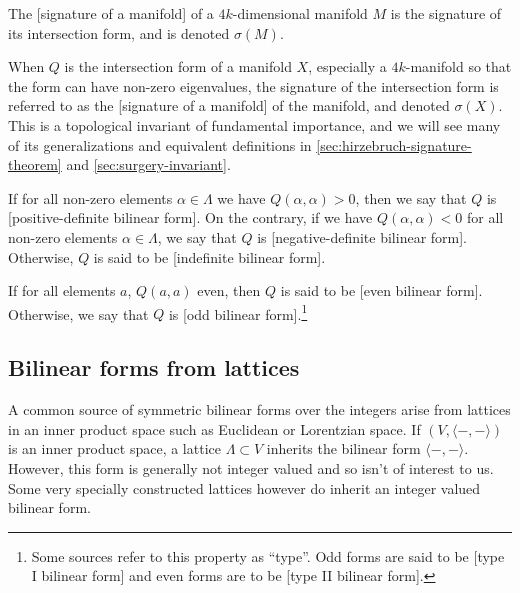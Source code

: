 \begin{definition}
	The [signature of a manifold] of a $4k$-dimensional manifold $M$ is the signature of its intersection form, and is denoted $\sigma(M)$.
\end{definition}

When $Q$ is the intersection form of a manifold $X$, especially a $4k$-manifold so that the form can have non-zero eigenvalues, the signature of the intersection form is referred to as the [signature of a manifold] of the manifold, and denoted $\sigma(X)$. This is a topological invariant of fundamental importance, and we will see many of its generalizations and equivalent definitions in \cref{sec:hirzebruch-signature-theorem} and \cref{sec:surgery-invariant}.

\begin{definition}
	If for all non-zero elements $\alpha\in \Lambda$ we have $Q(\alpha,\alpha)>0$, then we say that $Q$ is [positive-definite bilinear form]. On the contrary, if we have $Q(\alpha,\alpha)<0$ for all non-zero elements $\alpha\in \Lambda$, we say that $Q$ is [negative-definite bilinear form]. Otherwise, $Q$ is said to be [indefinite bilinear form].
\end{definition}

\begin{definition}
	If for all elements $a$, $Q(a,a)$ even, then $Q$ is said to be [even bilinear form]. Otherwise, we say that $Q$ is [odd bilinear form].\footnote{Some sources refer to this property as ``type''. Odd forms are said to be [type I bilinear form] and even forms are to be [type II bilinear form].}
\end{definition}

\subsection{Bilinear forms from lattices}

A common source of symmetric bilinear forms over the integers arise from lattices in an inner product space such as Euclidean or Lorentzian space. If $(V,\langle -,-\rangle)$ is an inner product space, a lattice $\Lambda\subset V$ inherits the bilinear form $\langle -,-\rangle$. However, this form is generally not integer valued and so isn't of interest to us. Some very specially constructed lattices however do inherit an integer valued bilinear form.

